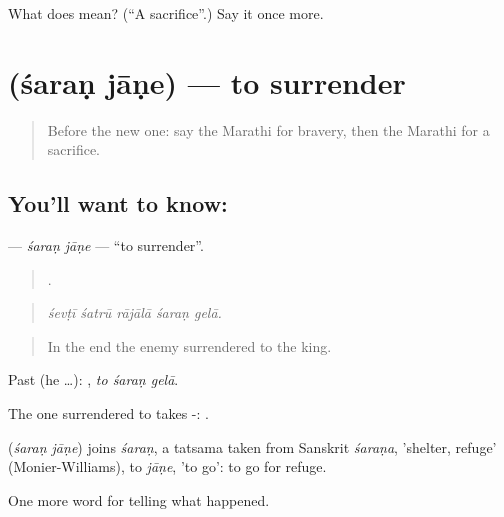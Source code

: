 \begin{tcolorbox}[breakable,colback=teal!4,colframe=teal!35!black,title={Before you move on}]
What does  mean? (\textquotedblleft{}A sacrifice\textquotedblright{}.) Say it once more.
\end{tcolorbox}
\section[\texorpdfstring{\mr{शरण} \mr{जाणे} (śaraṇ jāṇe)}{शरण जाणे (śaraṇ jāṇe)}]{  (śaraṇ jāṇe) — to surrender}

\label{lesson:MR-C332-saran-jane}



\begin{quote}
Before the new one: say the Marathi for bravery, then the Marathi for a sacrifice.
\end{quote}

\subsection*{You'll want to know:  }
\textbf{ } — \emph{śaraṇ jāṇe} — \textquotedblleft{}to surrender\textquotedblright{}.

\begin{quote}
    .
\end{quote}

\begin{quote}
\emph{śevṭī śatrū rājālā śaraṇ gelā.}
\end{quote}

\begin{quote}
In the end the enemy surrendered to the king.
\end{quote}

Past (he …):   , \emph{to śaraṇ gelā}.

The one surrendered to takes -:   .

\begin{cousinweb}
\textbf{ } (\emph{śaraṇ jāṇe}) joins \emph{śaraṇ}, a tatsama taken from Sanskrit \emph{śaraṇa}, 'shelter, refuge' (Monier-Williams), to \emph{jāṇe}, 'to go': to go for refuge.
\end{cousinweb}

\begin{grammarlens}[title={What you've built}]
One more word for telling what happened.
\end{grammarlens}

